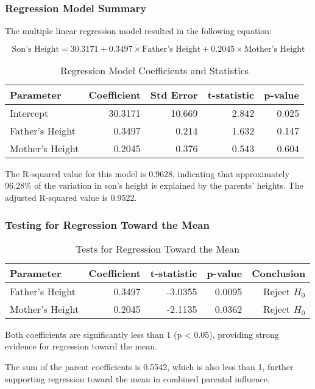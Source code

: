 \documentclass[12pt]{article}
\begin{document}
\subsubsection{Regression Model Summary}
The multiple linear regression model resulted in the following equation:

\begin{equation}
\text{Son's Height} = 30.3171 + 0.3497 \times \text{Father's Height} + 0.2045 \times \text{Mother's Height}
\end{equation}

\begin{table}[H]
\centering
\caption{Regression Model Coefficients and Statistics}
\begin{tabular}{lrrrr}
\toprule
Parameter & Coefficient & Std Error & t-statistic & p-value \\
\midrule
Intercept & 30.3171 & 10.669 & 2.842 & 0.025 \\
Father's Height & 0.3497 & 0.214 & 1.632 & 0.147 \\
Mother's Height & 0.2045 & 0.376 & 0.543 & 0.604 \\
\bottomrule
\end{tabular}
\end{table}

The R-squared value for this model is 0.9628, indicating that approximately 96.28\% of the variation in son's height is explained by the parents' heights. The adjusted R-squared value is 0.9522.

\subsubsection{Testing for Regression Toward the Mean}
\begin{table}[H]
\centering
\caption{Tests for Regression Toward the Mean}
\begin{tabular}{lrrrr}
\toprule
Parameter & Coefficient & t-statistic & p-value & Conclusion \\
\midrule
Father's Height & 0.3497 & -3.0355 & 0.0095 & Reject $H_0$ \\
Mother's Height & 0.2045 & -2.1135 & 0.0362 & Reject $H_0$ \\
\bottomrule
\end{tabular}
\end{table}

Both coefficients are significantly less than 1 (p < 0.05), providing strong evidence for regression toward the mean.

The sum of the parent coefficients is 0.5542, which is also less than 1, further supporting regression toward the mean in combined parental influence.
\end{document}
